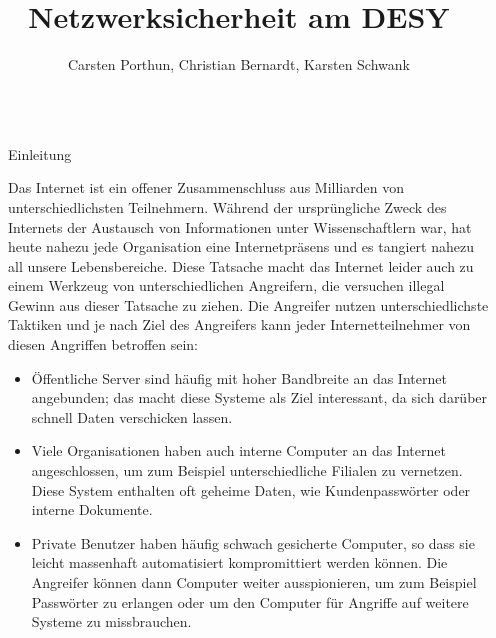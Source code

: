 \documentclass[final]{beamer}
\title{Netzwerksicherheit am DESY} %
\author{Carsten Porthun, Christian Bernardt, Karsten Schwank} %
\newlength{\sepwid}
\newlength{\twocolwid}
\begin{document}

\setlength{\belowcaptionskip}{2ex} %
\setlength\belowdisplayshortskip{2ex} %

\begin{frame}[t] %

\begin{columns}[t] %

\begin{column}{\sepwid}\end{column} %

\begin{column}{\twocolwid} %


\begin{block}{Einleitung}

Das Internet ist ein offener Zusammenschluss aus Milliarden von unterschiedlichsten
Teilnehmern. Während der ursprüngliche Zweck des Internets der Austausch von Informationen
unter Wissenschaftlern war, hat heute nahezu jede Organisation eine Internetpräsens und
es tangiert nahezu all unsere Lebensbereiche. Diese Tatsache macht das Internet leider auch
zu einem Werkzeug von unterschiedlichen Angreifern, die versuchen illegal Gewinn aus dieser
Tatsache zu ziehen.
Die Angreifer nutzen unterschiedlichste Taktiken und je nach Ziel des Angreifers kann jeder
Internetteilnehmer von diesen Angriffen betroffen sein:

\begin{itemize}
 \item Öffentliche Server sind häufig mit hoher Bandbreite an das Internet angebunden; das 
 macht diese Systeme als Ziel interessant, da sich darüber schnell Daten verschicken lassen.
 \item Viele Organisationen haben auch interne Computer an das Internet angeschlossen, um 
 zum Beispiel unterschiedliche Filialen zu vernetzen. Diese System enthalten oft geheime Daten, 
 wie Kundenpasswörter oder interne Dokumente.
 \item Private Benutzer haben häufig schwach gesicherte Computer, so dass sie leicht massenhaft
 automatisiert kompromittiert werden können. Die Angreifer können dann Computer weiter ausspionieren, 
 um zum Beispiel Passwörter zu erlangen oder um den Computer für Angriffe auf weitere Systeme 
 zu missbrauchen.
\end{itemize}


\end{block}
\end{column}
\end{columns}
\end{frame}
\end{document}
